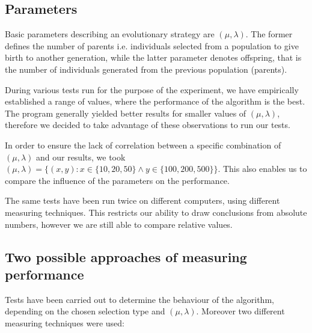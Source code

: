 \documentclass[a4paper]{article}
\begin{document}
\subsection{Parameters}
Basic parameters describing an evolutionary strategy are $(\mu, \lambda)$. The former defines the number of parents i.e. individuals selected from a population to give birth to another generation, while the latter parameter denotes offspring, that is the number of individuals generated from the previous population (parents).

During various tests run for the purpose of the experiment, we have empirically established a range of values, where the performance of the algorithm is the best. The program generally yielded better results for smaller values of $(\mu, \lambda)$, therefore we decided to take advantage of these observations to run our tests.

In order to ensure the lack of correlation between a specific combination of $(\mu, \lambda)$ and our results, we took  $(\mu, \lambda) = \{(x,y) : x \in \{10, 20, 50\} \wedge y \in \{100, 200, 500\}\}$. This also enables us to compare the influence of the parameters on the performance.

The same tests have been run twice on different computers, using different measuring techniques. This restricts our ability to draw conclusions from absolute numbers, however we are still able to compare relative values.


\subsection{Two possible approaches of measuring performance}
Tests have been carried out to determine the behaviour of the algorithm, depending on the chosen selection type and $(\mu, \lambda)$. Moreover two different measuring techniques were used:
\end{document}
